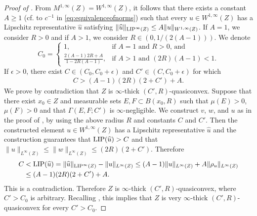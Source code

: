 \documentclass[reqno]{amsart}
\newcommand{\LIP}{{\rm LIP}}
\numberwithin{equation}{section}
\theoremstyle{remark}
\begin{document}
\begin{proof}[Proof of ]
    From $M^{1,\infty}(Z)=W^{1,\infty}(Z)$, it follows that there exists a constant $A \geq 1$ (cf. to $c^{-1}$ in \eqref{eq:equivalenceofnorms}) such that every $u \in W^{1,\infty}( Z )$ has a Lipschitz representative $\widehat u$ satisfying $\| \widehat u \|_{ \LIP^{\infty}(Z) } \leq A \| u \|_{ W^{1,\infty}(Z) }$. If $A = 1$, we consider $R > 0$ and if $A > 1$, we consider $R \in ( 0, 1/( 2(A-1) ) )$. We denote
    $$C_0=\begin{cases}
        1, & \text{if $A = 1$ and $R > 0$, and}\\
        \frac{2(A-1)2R+A}{1-2R(A-1)}, &\text{if $A > 1$ and $(2R)(A-1) < 1$}.
    \end{cases}$$
    If $\epsilon > 0$, there exist $C \in (C_0, C_0+\epsilon)$ and $C' \in ( C, C_0 + \epsilon )$ for which
    \begin{align*}
        C > ( A-1 )(2R)( 2 + C' ) + A.
    \end{align*}
    We prove by contradiction that $Z$ is $\infty$-thick $(C',R)$-quasiconvex. Suppose that there exist $x_0 \in Z$ and measurable sets $E, F \subset B( x_0, R )$ such that $\mu(E)>0$, $\mu(F) > 0$ and that $\Gamma( E, F; C' )$ is $\infty$-negligible. We construct $v$, $w$, and $u$ as in the proof of , by using the above radius $R$ and constants $C$ and $C'$. Then the constructed element $u \in W^{1,\infty}(Z)$ has a Lipschitz representative $\widehat{u}$ and the construction guarantees that $\LIP(\widehat{u}) > C$ and that $\| u \|_{L^{\infty}(Z)} \leq \| w \|_{L^{\infty}(Z)} \leq (2R)(2+C')$. Therefore
    \begin{align*}
        C
        &<\LIP(\widehat{u})=
        \| \widehat{u} \|_{ \LIP^{\infty}( Z ) } - \|u\|_{ L^{\infty}(Z) }
        \leq
        (A-1) \| u \|_{ L^{\infty}(Z) } + A \|\rho_{u}\|_{ L^{\infty}(Z) }
        \\
        &\leq
        ( A - 1 ) (2R)(2+C') + A.
    \end{align*}
    This is a contradiction. Therefore $Z$ is $\infty$-thick $(C',R)$-quasiconvex, where $C'>C_0$ is arbitrary. Recalling , this implies that $Z$ is very $\infty$-thick $(C',R)$-quasiconvex for every $C' > C_0$.





\end{proof}
\end{document}
